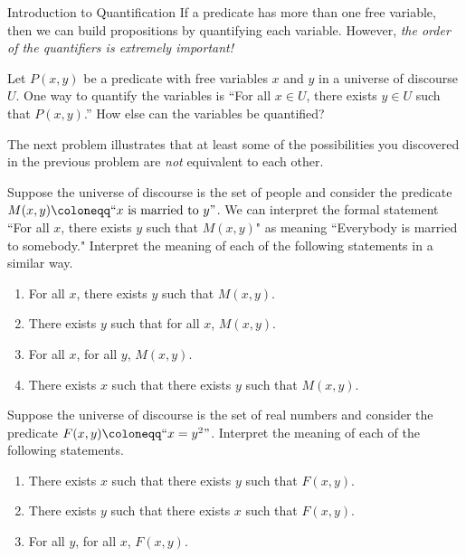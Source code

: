 \begin{section}{Introduction to Quantification}
If a predicate has more than one free variable, then we can build propositions by quantifying each variable.  However, \emph{the order of the quantifiers is extremely important!}

\begin{problem}\label{prob:ways to quantify}
Let $P(x,y)$ be a predicate with free variables $x$ and $y$ in a universe of discourse $U$. One way to quantify the variables is ``For all $x \in U$, there exists $y \in U$ such that $P(x,y)$.'' How else can the variables be quantified?
\end{problem}

The next problem illustrates that at least some of the possibilities you discovered in the previous problem are \emph{not} equivalent to each other.

\begin{problem}
Suppose the universe of discourse is the set of people and consider the predicate $M(x,y)\coloneqq ``x\mbox{ is married to }y"$.  We can interpret the formal statement ``For all $x$, there exists $y$ such that $M(x,y)$" as meaning ``Everybody is married to somebody."  Interpret the meaning of each of the following statements in a similar way.
\begin{enumerate}[label=\textrm{(\alph*)}]
\item For all $x$, there exists $y$ such that $M(x,y)$.
\item There exists $y$ such that for all $x$, $M(x,y)$.
\item For all $x$, for all $y$, $M(x,y)$.
\item There exists $x$ such that there exists $y$ such that $M(x,y)$.
\end{enumerate}
\end{problem}

\begin{problem}
Suppose the universe of discourse is the set of real numbers and consider the predicate $F(x,y)\coloneqq ``x=y^2"$. Interpret the meaning of each of the following statements.
\begin{enumerate}[label=\textrm{(\alph*)}]
\item There exists $x$ such that there exists $y$ such that $F(x,y)$.
\item There exists $y$ such that there exists $x$ such that $F(x,y)$.
\item For all $y$, for all $x$, $F(x,y)$.
\end{enumerate}
\end{problem}


\end{section}
